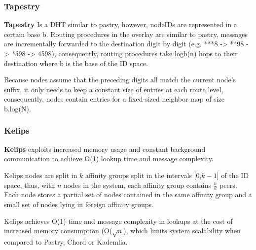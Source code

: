\subsubsection*{Tapestry}

\textbf{Tapestry} \cite{tapestry} Is a DHT similar to pastry, however, nodeIDs are represented in a certain base b. Routing procedures in the overlay are similar to pastry, messages are incrementally forwarded to the destination digit by digit (e.g. ***8 -> **98 -> *598 -> 4598), consequently, routing procedures take logb(n) hops to their destination where b is the base of the ID space. 

Because nodes assume that the preceding digits all match the current node's suffix, it only needs to keep a constant size of entries at each route level, consequently, nodes contain entries for a fixed-sized neighbor map of size b.log(N). 


\subsubsection*{Kelips}

\textbf{Kelips} \cite{gupta2003kelips} exploits increased memory usage and constant background communication to achieve O(1) lookup time and message complexity. 

Kelips nodes are split in $k$ affinity groups split in the intervals [0,$k-1$] of the ID space, thus, with $n$ nodes in the system, each affinity group contains $\frac{n}{k}$ peers.  Each node stores a partial set of nodes contained in the same affinity group and a small set of nodes lying in foreign affinity groups.

Kelips achieves O(1) time and message complexity in lookups at the cost of increased memory consumption (O($\sqrt{n}$), which limits system scalability  when compared to Pastry, Chord or Kademlia. 




